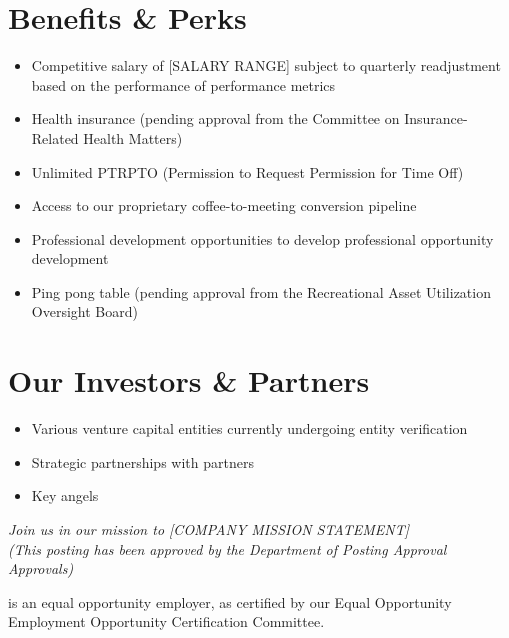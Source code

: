\documentclass[11pt,a4paper]{article}
\begin{document}
\section*{Benefits \& Perks}
\begin{itemize}
  \item Competitive salary of [SALARY RANGE] subject to quarterly readjustment based on the performance of performance metrics
  \item Health insurance (pending approval from the Committee on Insurance-Related Health Matters)
  \item Unlimited PTRPTO (Permission to Request Permission for Time Off)
  \item Access to our proprietary coffee-to-meeting conversion pipeline
  \item Professional development opportunities to develop professional opportunity development
  \item Ping pong table (pending approval from the Recreational Asset Utilization Oversight Board)
\end{itemize}

\section*{Our Investors \& Partners}
\begin{itemize}
  \item Various venture capital entities currently undergoing entity verification
  \item Strategic partnerships with partners
  \item Key angels
\end{itemize}

\vspace{1em}
\begin{center}
\textit{Join us in our mission to [COMPANY MISSION STATEMENT] \\
(This posting has been approved by the Department of Posting Approval Approvals)}
\end{center}

\small
{} is an equal opportunity employer, as certified by our Equal Opportunity Employment Opportunity Certification Committee.
\end{document}
